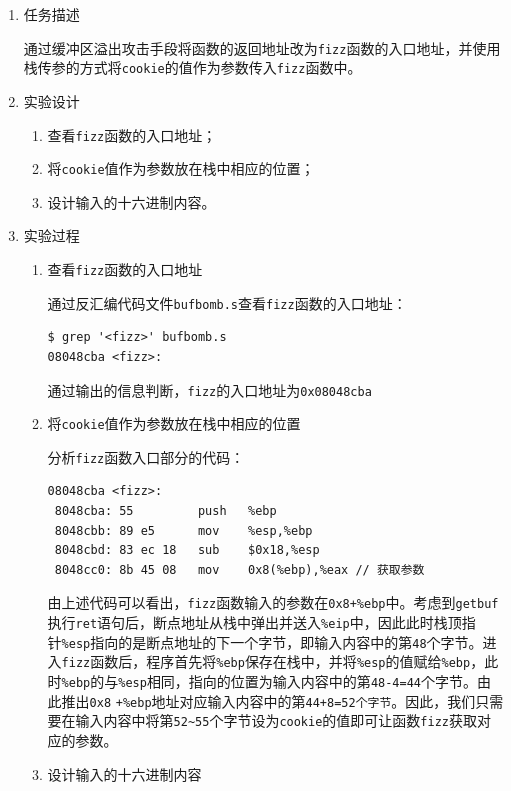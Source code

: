 \documentclass{paper}
\begin{document}
\begin{enumerate}
\item 任务描述

通过缓冲区溢出攻击手段将函数的返回地址改为\verb|fizz|函数的入口地址，并使用栈传参的方式将\verb|cookie|的值作为参数传入\verb|fizz|函数中。

\item 实验设计

\begin{enumerate}
\item 查看\verb|fizz|函数的入口地址；
\item 将\verb|cookie|值作为参数放在栈中相应的位置；
\item 设计输入的十六进制内容。

\end{enumerate}

\item 实验过程

\begin{enumerate}
\item 查看\verb|fizz|函数的入口地址

通过反汇编代码文件\verb|bufbomb.s|查看\verb|fizz|函数的入口地址：
\begin{lstlisting}
$ grep '<fizz>' bufbomb.s
08048cba <fizz>:
\end{lstlisting}
通过输出的信息判断，\verb|fizz|的入口地址为\verb|0x08048cba|

\item 将\verb|cookie|值作为参数放在栈中相应的位置

分析\verb|fizz|函数入口部分的代码：
\begin{lstlisting}
08048cba <fizz>:
 8048cba: 55         push   %ebp
 8048cbb: 89 e5      mov    %esp,%ebp
 8048cbd: 83 ec 18   sub    $0x18,%esp
 8048cc0: 8b 45 08   mov    0x8(%ebp),%eax // 获取参数
\end{lstlisting}
由上述代码可以看出，\verb|fizz|函数输入的参数在\verb|0x8+%ebp|中。考虑到\verb|getbuf|执行\verb|ret|语句后，断点地址从栈中弹出并送入\verb|%eip|中，因此此时栈顶指针\verb|%esp|指向的是断点地址的下一个字节，即输入内容中的第\verb|48|个字节。进入\verb|fizz|函数后，程序首先将\verb|%ebp|保存在栈中，并将\verb|%esp|的值赋给\verb|%ebp|，此时\verb|%ebp|的与\verb|%esp|相同，指向的位置为输入内容中的第\verb|48-4=44|个字节。由此推出\verb|0x8| \verb|+%ebp|地址对应输入内容中的第\verb|44+8=52个字节|。因此，我们只需要在输入内容中将第\verb|52~55|个字节设为\verb|cookie|的值即可让函数\verb|fizz|获取对应的参数。

\item 设计输入的十六进制内容


\end{enumerate}
\end{enumerate}
\end{document}
